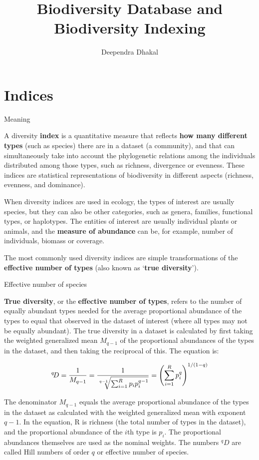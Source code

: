 \documentclass[
  ignorenonframetext,
  aspectratio=169]{beamer}
\title{Biodiversity Database and Biodiversity Indexing}
\author{Deependra Dhakal}
\date{}
\institute{College of Natural Resource Management, Tikapur,
Kailali \and Agriculture and Forestry University}
\begin{document}
\frame{\titlepage}

\begin{frame}[allowframebreaks]
  \tableofcontents[hideallsubsections]
\end{frame}
\hypertarget{indices}{%
\section{Indices}\label{indices}}

\begin{frame}{Meaning}
\protect\hypertarget{meaning}{}
\footnotesize

A diversity \textbf{index} is a quantitative measure that reflects
\textbf{how many different types} (such as species) there are in a
dataset (a community), and that can simultaneously take into account the
phylogenetic relations among the individuals distributed among those
types, such as richness, divergence or evenness. These indices are
statistical representations of biodiversity in different aspects
(richness, evenness, and dominance).

When diversity indices are used in ecology, the types of interest are
usually species, but they can also be other categories, such as genera,
families, functional types, or haplotypes. The entities of interest are
usually individual plants or animals, and the \textbf{measure of
abundance} can be, for example, number of individuals, biomass or
coverage.

The most commonly used diversity indices are simple transformations of
the \textbf{effective number of types} (also known as `\textbf{true
diversity}').
\end{frame}

\begin{frame}{Effective number of species}
\protect\hypertarget{effective-number-of-species}{}
\footnotesize

\textbf{True diversity}, or the \textbf{effective number of types},
refers to the number of equally abundant types needed for the average
proportional abundance of the types to equal that observed in the
dataset of interest (where all types may not be equally abundant). The
true diversity in a dataset is calculated by first taking the weighted
generalized mean \(M_{q-1}\) of the proportional abundances of the types
in the dataset, and then taking the reciprocal of this. The equation is:

\[
{}^{q}\!D={1 \over M_{q-1}}=
{1 \over {\sqrt[{q-1}]{\sum_{i=1}^{R}p_{i}p_{i}^{q-1}}}}=\left({\sum_{i=1}^{R}p_{i}^{q}}\right)^{1/(1-q)}
\]

The denominator \(M_{q-1}\) equals the average proportional abundance of
the types in the dataset as calculated with the weighted generalized
mean with exponent \(q-1\). In the equation, R is richness (the total
number of types in the dataset), and the proportional abundance of the
\(i\)th type is \(p_i\). The proportional abundances themselves are used
as the nominal weights. The numbers \({}^{q}D\) are called Hill numbers
of order \(q\) or effective number of species.
\end{frame}
\end{document}
